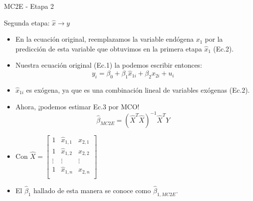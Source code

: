 \documentclass[10pt]{beamer}
\begin{document}
\begin{frame}{MC2E - Etapa 2}

Segunda etapa: $\hat{x} \rightarrow y$

\begin{itemize}
    \item En la ecuación original, reemplazamos la variable endógena $x_1$ por la predicción de esta variable que obtuvimos en la primera etapa $\hat{x}_1$ (Ec.2).
    
    \item Nuestra ecuación original (Ec.1) la podemos escribir entonces:
    \begin{equation}
    y_i = \beta_0 + \beta_1 \hat{x}_{1i} + \beta_2 x_{2i} + u_i
    \end{equation}
    
    \item $\hat{x}_{1i}$ es exógena, ya que es una combinación lineal de variables exógenas (Ec.2).
    
    \item Ahora, ¡podemos estimar Ec.3 por MCO!
    \begin{equation}
    \hat{\beta}_{MC2E} = (\hat{X}^T \hat{X})^{-1} \hat{X}^T Y
    \end{equation}
    
    \item Con $\hat{X} =    \begin{bmatrix}
    1 & \hat{x}_{1,1} & x_{2,1} \\
    1 & \hat{x}_{1,2} & x_{2,2} \\
    \vdots & \vdots & \vdots \\
    1 & \hat{x}_{1,n} & x_{2,n} \\
    \end{bmatrix}$ 
    
    \item El $\hat{\beta}_1$ hallado de esta manera se conoce como $\hat{\beta}_{1,MC2E}$.
\end{itemize}

\end{frame}

\end{document}
